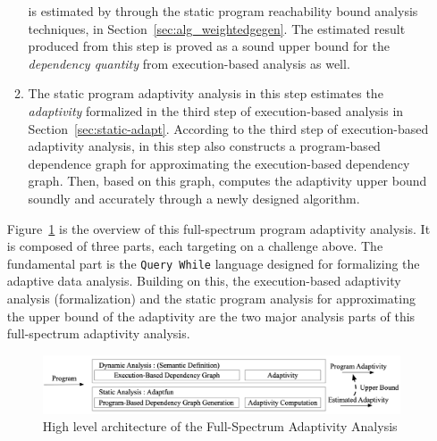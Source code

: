 \begin{enumerate}
\begin{enumerate}
is estimated by {\THESYSTEM} through the static program reachability bound analysis techniques, in Section~\ref{sec:alg_weightedgegen}.
The estimated result produced from 
this step is proved as a sound upper bound for the \emph{dependency quantity} from execution-based analysis as well.
\item 
The static program adaptivity analysis in this step
estimates the \emph{adaptivity} formalized in the third step of execution-based analysis in Section~\ref{sec:static-adapt}.
According to the third step of execution-based adaptivity analysis, 
{\THESYSTEM} in this step also constructs a program-based dependence graph for approximating the execution-based dependency graph.
Then, based on this graph, {\THESYSTEM} 
computes the adaptivity upper bound soundly 
and accurately through a newly designed algorithm.
\end{enumerate}
Figure~\ref{fig:structure} is the overview of this full-spectrum program adaptivity analysis.
It is composed of three parts, each targeting on a challenge above.
The fundamental part is the {\tt Query While} language designed for formalizing the 
adaptive data analysis. Building on this, 
the execution-based adaptivity analysis (formalization)
and the static program analysis for approximating the upper bound of the 
adaptivity are the two major analysis parts of this full-spectrum adaptivity analysis.
\begin{figure}
   \centering   
   \includegraphics[width=1.0\textwidth]{figures/architecture.png}
  \caption{High level architecture of the Full-Spectrum Adaptivity Analysis}
   \label{fig:structure}
\end{figure}
\end{enumerate}%


